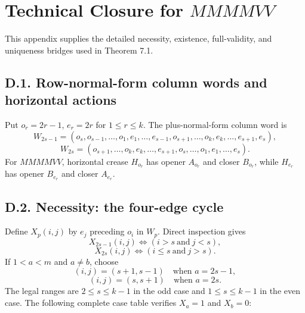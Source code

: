 \documentclass[11pt]{article}
\theoremstyle{definition}
\theoremstyle{remark}
\begin{document}
\appendix
\section{\texorpdfstring{Technical Closure for
\(MMMMVV\)}{Technical Closure for MMMMVV}}\label{appendix-d.-technical-closure-for-mmmmvv}

This appendix supplies the detailed necessity, existence, full-validity,
and uniqueness bridges used in Theorem 7.1.

\subsection{D.1. Row-normal-form column words and horizontal
actions}\label{d.1.-row-normal-form-column-words-and-horizontal-actions}

Put \(o_r=2r-1\), \(e_r=2r\) for \(1\le r\le k\). The plus-normal-form
column word is \[
W_{2s-1}=(o_s,o_{s-1},\ldots,o_1,e_1,\ldots,e_{s-1},o_{s+1},\ldots,o_k,e_k,\ldots,e_{s+1},e_s),
\] \[
W_{2s}=(o_{s+1},\ldots,o_k,e_k,\ldots,e_{s+1},o_s,\ldots,o_1,e_1,\ldots,e_s).
\] For \(MMMMVV\), horizontal crease \(H_{o_r}\) has opener \(A_{o_r}\)
and closer \(B_{o_r}\), while \(H_{e_r}\) has opener \(B_{e_r}\) and
closer \(A_{e_r}\).

\subsection{D.2. Necessity: the four-edge
cycle}\label{d.2.-necessity-the-four-edge-cycle}

Define \(X_p(i,j)\) by \(e_j\) preceding \(o_i\) in \(W_p\). Direct
inspection gives \[
X_{2s-1}(i,j)\iff (i>s\ \text{and}\ j<s),
\] \[
X_{2s}(i,j)\iff (i\le s\ \text{and}\ j>s).
\] If \(1<a<m\) and \(a\ne b\), choose \[
(i,j)=(s+1,s-1)\quad\text{when }a=2s-1,
\] \[
(i,j)=(s,s+1)\quad\text{when }a=2s.
\] The legal ranges are \(2\le s\le k-1\) in the odd case and
\(1\le s\le k-1\) in the even case. The following complete case table
verifies \(X_a=1\) and \(X_b=0\):
\end{document}
